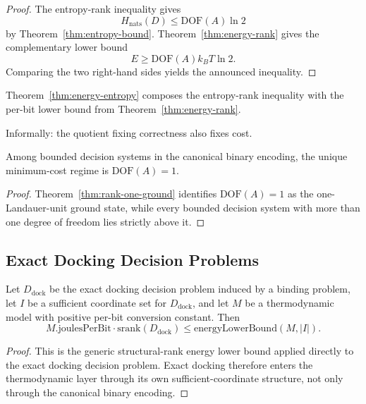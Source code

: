 \begin{proof}
The entropy-rank inequality gives
\[
H_{\mathrm{nats}}(D) \le \mathrm{DOF}(A)\ln 2
\]
by Theorem~\ref{thm:entropy-bound}. Theorem~\ref{thm:energy-rank} gives the complementary lower bound
\[
E \ge \mathrm{DOF}(A) k_B T \ln 2.
\]
Comparing the two right-hand sides yields the announced inequality.
\end{proof}

Theorem~\ref{thm:energy-entropy} composes the entropy-rank inequality with the per-bit lower bound from Theorem~\ref{thm:energy-rank}.

Informally: the quotient fixing correctness also fixes cost.

\begin{corollary}\label{cor:minimum-cost-regime}
Among bounded decision systems in the canonical binary encoding, the unique minimum-cost regime is $\mathrm{DOF}(A)=1$.
\end{corollary}

\begin{proof}
Theorem~\ref{thm:rank-one-ground} identifies $\mathrm{DOF}(A)=1$ as the one-Landauer-unit ground state, while every bounded decision system with more than one degree of freedom lies strictly above it.
\end{proof}

\subsection{Exact Docking Decision Problems}

\begin{theorem}\label{thm:md-energy-rank}
Let $D_{\mathrm{dock}}$ be the exact docking decision problem induced by a binding problem, let $I$ be a sufficient coordinate set for $D_{\mathrm{dock}}$, and let $M$ be a thermodynamic model with positive per-bit conversion constant. Then
\[
M.\mathrm{joulesPerBit}\cdot \mathrm{srank}(D_{\mathrm{dock}})
\le
\mathrm{energyLowerBound}(M,|I|).
\]
\end{theorem}

\begin{proof}
This is the generic structural-rank energy lower bound applied directly to the exact docking decision problem. Exact docking therefore enters the thermodynamic layer through its own sufficient-coordinate structure, not only through the canonical binary encoding.
\end{proof}

